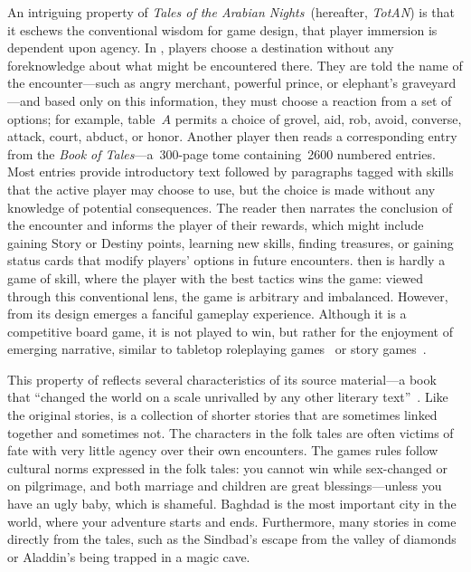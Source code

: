 \documentclass[a4paper]{article}
\begin{document}
An intriguing property of \textit{Tales of the Arabian Nights}~(hereafter, \textit{TotAN}) is that it eschews the conventional wisdom for game design,
that player immersion is dependent upon agency.
In \totan{}, 
players choose a destination without any foreknowledge about
what might be encountered there.
They are told the name of the
encounter---such as angry merchant,  powerful prince, or
elephant's graveyard---and based only on this information,
they must choose a reaction from a set of options; for example, 
table~$A$ permits a choice of grovel, aid, rob, avoid, converse,
attack, court, abduct, or honor.
Another player then reads a corresponding entry from 
the \textit{Book of Tales}---a~300-page tome containing~2600 numbered entries.
Most entries provide introductory text followed by paragraphs
tagged with skills that the active player may choose to use, but the choice
is made without any knowledge of potential consequences.
The reader then narrates the conclusion of the
encounter and informs the player of their rewards, which might include
gaining Story or Destiny points, learning new skills, finding treasures, or
gaining status cards that modify players' options in future encounters.
\totan{} then is hardly a game of skill, where the player with the best tactics
wins the game: viewed through this conventional lens, the game is arbitrary
and imbalanced. However, from its design emerges a fanciful gameplay
experience.
Although it is a competitive board game, 
it is not played to win,
but rather for the enjoyment of emerging narrative,
similar to tabletop roleplaying games~\citep{Grouling2001}
or story games~\citep{Duncan2015}.

This property of \totan{} reflects several characteristics
of its source material---a book that ``changed the world on a scale
unrivalled by any other literary text''~\citep[p.1]{Makdisi2008}.
Like the original stories, \totan{} is a collection of shorter stories
that are sometimes linked together and sometimes not.
The characters in the folk tales are often victims of fate with
very little agency over their own encounters. The games rules follow
cultural norms expressed in the folk tales:
you cannot win while sex-changed or on pilgrimage, and both marriage
and children are great blessings---unless you have an ugly baby,
which is shameful.
Baghdad is the most important city in the world, where your adventure starts
and ends.
Furthermore, many stories in \totan{} come directly from the tales,
such as the Sindbad's escape from the valley of diamonds or Aladdin's
being trapped in a magic cave. 
\end{document}
